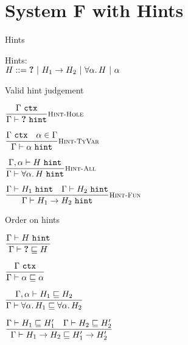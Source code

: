 \documentclass{beamer}
\begin{document}
\section{System F with Hints}


\begin{frame}{Hints}

Hints: \\
$H ::= \textbf{?} \ |\  H_1 \to H_2 \ |\  \forall \alpha.\, H \ |\  \alpha$

\end{frame}

\begin{frame}{Valid hint judgement}

\begin{center}
  $\infrule[Hint-Hole]{\ctx{\Gamma}}{\validhint{\Hole}}$

  \vspace{2em}

  $\infrule[Hint-TyVar]{\ctx{\Gamma} \quad \sidecond{\alpha \in \Gamma}}{\validhint{\alpha}}$

  \vspace{2em}

  $\infrule[Hint-All]{\validhint[\extendtype{\Gamma}{\alpha}]{H}}{\validhint{\ForallT{\alpha}{H}}}$

  \vspace{2em}

  $\infrule[Hint-Fun]{\validhint{H_1} \quad \validhint{H_2}}{\validhint{\Fun{H_1}{H_2}}}$
\end{center}

\end{frame}


\begin{frame}{Order on hints}

\begin{center}
  $\infrule{\validhint{H}}{\hintorderinctx{\Hole}{H}}$

  \vspace{2em}

  $\infrule{\ctx{\Gamma}}{\hintorderinctx{\alpha}{\alpha}}$

  \vspace{2em}

  $\infrule{\hintorderinctx[\extendtype{\Gamma}{\alpha}]{H_1}{H_2}}{\hintorderinctx{\ForallT{\alpha}{H_1}}{\ForallT{\alpha}{H_2}}}$

  \vspace{2em}

  $\infrule{\hintorderinctx{H_1}{H_1'} \quad \hintorderinctx{H_2}{H_2'}}{\hintorderinctx{\Fun{H_1}{H_2}}{\Fun{H'_1}{H'_2}}}$

\end{center}

\end{frame}
\end{document}
